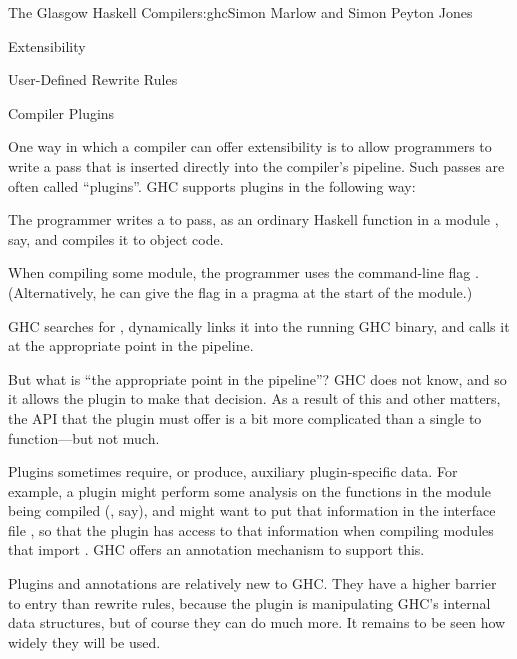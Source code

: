 \begin{aosachapter}{The Glasgow Haskell Compiler}{s:ghc}{Simon Marlow and Simon Peyton Jones}
\begin{aosasect1}{Extensibility}
\begin{aosasect2}{User-Defined Rewrite Rules}
\end{aosasect2}

\begin{aosasect2}{Compiler Plugins}

One way in which a compiler can offer extensibility is to allow
programmers to write a pass that is inserted directly into the
compiler's pipeline.  Such passes are often called ``plugins''.  GHC
supports plugins in the following way:

\begin{aosaitemize}

\item The programmer writes a  to  pass, as an ordinary
  Haskell function in a module , say, and compiles it to
  object code.

\item When compiling some module, the programmer uses the command-line
  flag .  (Alternatively, he can give the flag in a
  pragma at the start of the module.)

\item GHC searches for , dynamically links it into the
  running GHC binary, and calls it at the appropriate point in the
  pipeline.

\end{aosaitemize}

But what is ``the appropriate point in the pipeline''?  GHC does not
know, and so it allows the plugin to make that decision.  As a result
of this and other matters, the API that the plugin must offer is a bit
more complicated than a single  to  function---but not
much.

Plugins sometimes require, or produce, auxiliary plugin-specific data.
For example, a plugin might perform some analysis on the functions in
the module being compiled (, say), and might want to put
that information in the interface file , so that the plugin
has access to that information when compiling modules that import
.  GHC offers an annotation mechanism to support this.

Plugins and annotations are relatively new to GHC.  They have a higher
barrier to entry than rewrite rules, because the plugin is
manipulating GHC's internal data structures, but of course they can do
much more.  It remains to be seen how widely they will be used.

\end{aosasect2}


\end{aosasect1}
\end{aosachapter}
